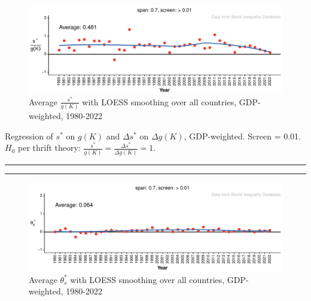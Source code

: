 \documentclass[a4paper,fleqn]{latex_styles/cas-sc}
\begin{document}
\FloatBarrier
\begin{figure}[pos=H]
    \centering
        \includegraphics[width=1\textwidth]{./figure-pdf/fig-s_c_theta_plots-1.pdf}
    \captionsetup{justification=centering}
    \caption{\textcolor[HTML]{EF3B2C}{Average \(\frac{s^*}{g(K)}\)} with \textcolor[HTML]{386CB0}{LOESS smoothing} over all countries, GDP-weighted, 1980-2022} %
    \label{fig-s_c_theta_plots}
\end{figure}
%
\vfill
%
\begin{table}[pos=h]
    \caption{Regression of \(s^*\) on \(g(K)\) and \(\Delta s^*\) on \(\Delta g(K)\), GDP-weighted. Screen = 0.01. \(H_0\) per thrift theory: \(\frac{s^*}{g(K)} = \frac{\Delta s^*}{\Delta g(K)} = 1\).\label{tbl-reg_s}}
    \hrule
    \centering
\begin{minipage}{0.45\textwidth}

\end{minipage}
\hfill
    \begin{minipage}{0.45\textwidth}

\end{minipage}
\hrule
\end{table}
%
\vfill
%
\begin{figure}[pos=H]
    \centering
        \includegraphics[width=1\textwidth]{./figure-pdf/fig-si_plots-1.pdf}
    \captionsetup{justification=centering}
    \caption{\textcolor[HTML]{EF3B2C}{Average \(\theta_s^*\)} with \textcolor[HTML]{386CB0}{LOESS smoothing} over all countries, GDP-weighted, 1980-2022} %
    \label{fig-si_plots}
\end{figure}
%
\FloatBarrier

\FloatBarrier
%
\end{document}
